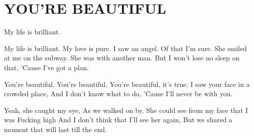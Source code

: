 \documentclass[../../../songbook.tex]{subfiles}
\begin{document}
\TabPositions{8cm} %
\section*{YOU'RE BEAUTIFUL}
{}
\vspace{0.5cm}

My life is brilliant. \newline	 

My life is brilliant. My love is pure.	 \newline		
I saw an angel. Of that I'm sure.		 \newline	
She smiled at me on the subway.			 \newline	
She was with another man.				 \newline	
But I won't lose no sleep on that,		 \newline	
'Cause I've got a plan.

\-\hspace{1cm} You're beautiful. You're beautiful.	 \newline	
\-\hspace{1cm} You're beautiful, it's true.			 \newline	
\-\hspace{1cm} I saw your face in a crowded place,	 \newline	
\-\hspace{1cm} And I don't know what to do,			 \newline	
\-\hspace{1cm} 'Cause I'll never be with you.		 \newline	

Yeah, she caught my eye, 							\newline
As we walked on by.									\newline
She could see from my face that I was				\newline
Fucking high 										\newline
And I don't think that I'll see her again,			\newline
But we shared a moment that will last till the end.	\newline
\end{document}
